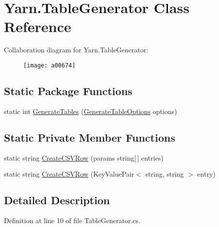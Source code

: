 \hypertarget{a00153}{\section{Yarn.\-Table\-Generator Class Reference}
\label{a00153}
}


Collaboration diagram for Yarn.\-Table\-Generator\-:
\nopagebreak
\begin{figure}[H]
\begin{center}
\leavevmode
\texttt{[image: a00674]}
\end{center}
\end{figure}
\subsection*{Static Package Functions}
\begin{DoxyCompactItemize}
\item 
static int \hyperlink{a00153_a1d65ef643c3f3495cf9480f86172ff87}{Generate\-Tables} (\hyperlink{a00104}{Generate\-Table\-Options} options)
\end{DoxyCompactItemize}
\subsection*{Static Private Member Functions}
\begin{DoxyCompactItemize}
\item 
static string \hyperlink{a00153_ac03637d16d3512258c997b9a21af6c42}{Create\-C\-S\-V\-Row} (params string\mbox{[}$\,$\mbox{]} entries)
\item 
static string \hyperlink{a00153_aa16da6b6810ce3a5fd2a7920de6322ef}{Create\-C\-S\-V\-Row} (Key\-Value\-Pair$<$ string, string $>$ entry)
\end{DoxyCompactItemize}


\subsection{Detailed Description}


Definition at line 10 of file Table\-Generator.\-cs.




